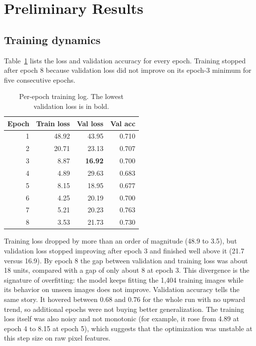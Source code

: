 \documentclass[conference]{IEEEtran}
\begin{document}
\section{Preliminary Results}

\subsection{Training dynamics}

Table~\ref{tab:epochs} lists the loss and validation accuracy for every
epoch. Training stopped after epoch 8 because validation loss did not improve
on its epoch-3 minimum for five consecutive epochs.

\begin{table}[htbp]
\caption{Per-epoch training log. The lowest validation loss is in bold.}
\label{tab:epochs}
\centering
\begin{tabular}{@{}rrrr@{}}
\toprule
Epoch & Train loss & Val loss & Val acc \\
\midrule
1 & 48.92 & 43.95 & 0.710 \\
2 & 20.71 & 23.13 & 0.707 \\
3 & 8.87 & \textbf{16.92} & 0.700 \\
4 & 4.89 & 29.63 & 0.683 \\
5 & 8.15 & 18.95 & 0.677 \\
6 & 4.25 & 20.19 & 0.700 \\
7 & 5.21 & 20.23 & 0.763 \\
8 & 3.53 & 21.73 & 0.730 \\
\bottomrule
\end{tabular}
\end{table}

Training loss dropped by more than an order of magnitude (48.9 to 3.5), but
validation loss stopped improving after epoch 3 and finished well above it
(21.7 versus 16.9). By epoch 8 the gap between validation and training loss
was about 18 units, compared with a gap of only about 8 at epoch 3. This
divergence is the signature of overfitting: the model keeps fitting the
1{,}404 training images while its behavior on unseen images does not improve.
Validation accuracy tells the same story. It hovered between 0.68 and 0.76
for the whole run with no upward trend, so additional epochs were not buying
better generalization. The training loss itself was also noisy and not
monotonic (for example, it rose from 4.89 at epoch 4 to 8.15 at epoch 5),
which suggests that the optimization was unstable at this step size on raw
pixel features.
\end{document}
